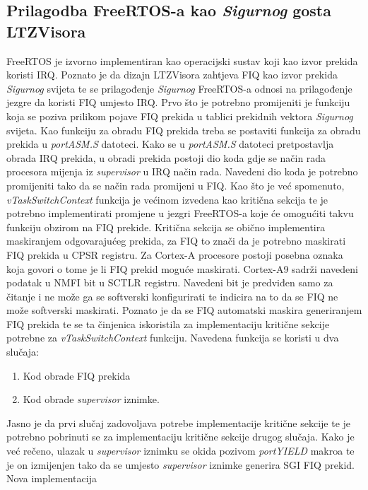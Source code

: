 \documentclass[times, utf8, diplomski, numeric]{fer}
\begin{document}
\subsection{Prilagodba FreeRTOS-a kao \textit{Sigurnog} gosta LTZVisora}
FreeRTOS je izvorno implementiran kao operacijski sustav koji kao izvor prekida koristi IRQ. Poznato je da dizajn LTZVisora
zahtjeva FIQ kao izvor prekida \textit{Sigurnog} svijeta te se prilagođenje \textit{Sigurnog} FreeRTOS-a odnosi na
prilagođenje jezgre da koristi FIQ umjesto IRQ. Prvo što je potrebno promijeniti je funkciju koja se poziva prilikom pojave
FIQ prekida u tablici prekidnih vektora \textit{Sigurnog} svijeta. Kao funkciju za obradu FIQ prekida treba se postaviti
funkcija za obradu prekida u \textit{portASM.S} datoteci. Kako se u \textit{portASM.S} datoteci pretpostavlja obrada IRQ
prekida, u obradi prekida postoji dio koda gdje se način rada procesora mijenja iz \textit{supervisor} u IRQ način rada.
Navedeni dio koda je potrebno promijeniti tako da se način rada promijeni u FIQ. Kao što je već spomenuto,
\textit{vTaskSwitchContext} funkcija je većinom izvedena kao kritična sekcija te je potrebno implementirati promjene u
jezgri FreeRTOS-a koje će omogućiti takvu funkciju obzirom na FIQ prekide. Kritična sekcija se obično implementira
maskiranjem odgovarajućeg prekida, za FIQ to znači da je potrebno maskirati FIQ prekida u CPSR registru. Za Cortex-A procesore
postoji posebna oznaka koja govori o tome je li FIQ prekid moguće maskirati. Cortex-A9 sadrži navedeni podatak u NMFI
 bit u SCTLR registru. Navedeni bit je predviđen samo za čitanje i ne može ga se
softverski konfigurirati te indicira na to da se FIQ ne može softverski maskirati. Poznato je da se FIQ automatski maskira
generiranjem FIQ prekida te se ta činjenica iskoristila za implementaciju kritične sekcije potrebne za
\textit{vTaskSwitchContext} funkciju.
\newpage
Navedena funkcija se koristi u dva slučaja:
\begin{enumerate}
  \item {Kod obrade FIQ prekida}
  \item{Kod obrade \textit{supervisor} iznimke.}
\end{enumerate}
Jasno je da prvi slučaj zadovoljava potrebe implementacije kritične sekcije te je potrebno pobrinuti se za implementaciju
kritične sekcije drugog slučaja. Kako je već rečeno, ulazak u \textit{supervisor} iznimku se okida pozivom \textit{portYIELD}
makroa te je on izmijenjen tako da se umjesto \textit{supervisor} iznimke generira SGI FIQ prekid. Nova implementacija
\end{document}
